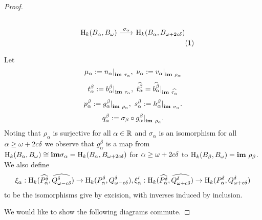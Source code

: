 \begin{proof}
\begin{scriptsize}
\begin{subequations}
\begin{minipage}{0.5\textwidth}
\begin{equation}
\begin{tikzcd}[column sep=scriptsize]
    \hom_k(B_\alpha, \B)\arrow{r}{\sigma_\alpha} &
    \hom_k(B_\alpha, \BB)
  \end{tikzcd}\end{equation}\end{minipage}
  \end{subequations}\vspace{3ex}
  \end{scriptsize}

  Let
  \[ \mu_\alpha := n_\alpha\mathord{\mid}_{\mathbf{im}~\tau_\alpha},\ \nu_\alpha := v_\alpha\mathord{\mid}_{\mathbf{im}~\rho_\alpha}\]
  \[ t_\alpha^\beta := b_\alpha^\beta\mathord{\mid}_{\mathbf{im}~\tau_\alpha},\ \widehat{t_\alpha^\beta} = \widehat{b_\alpha^\beta}\mathord{\mid}_{\mathbf{im}~\widehat{\tau_\alpha}}\]
  \[ p_\alpha^\beta := g_\alpha^\beta\mathord{\mid}_{\mathbf{im}~\rho_\alpha},\ s_\alpha^\beta := h_\alpha^\beta\mathord{\mid}_{\mathbf{im}~\sigma_\alpha}.\]
  \[q_\alpha^\beta := \sigma_\beta\circ g_\alpha^\beta\mathord{\mid}_{\mathbf{im}~\rho_\alpha}.\]%
  Noting that $\rho_\alpha$ is surjective for all $\alpha\in\mathbb{R}$ and $\sigma_\alpha$ is an isomorphism for all $\alpha\geq\omega+2c{\delta}$ we observe that $g_\alpha^\beta$ is a map from $\mathrm{H}_k(B_\alpha, B_{\omega})\cong \mathbf{im}\sigma_\alpha = \mathrm{H}_k(B_\alpha, B_{\omega + 2c{\delta}})$ for $\alpha\geq\omega+2c{\delta}$ to $\mathrm{H}_k(B_\beta, B_{\omega})= \mathbf{im}~\rho_\beta$.
  We also define
  \[ \xi_\alpha : \mathrm{H}_k(\widehat{P^{{\delta}}_\alpha}, \widehat{Q_{\omega - c{\delta}}^{\delta}})\to \mathrm{H}_k(P^{{\delta}}_\alpha, Q_{\omega - c{\delta}}^{\delta}), \xi_\alpha' : \mathrm{H}_k(\widehat{P^{{\delta}}_\alpha}, \widehat{Q_{\omega + c{\delta}}^{\delta}})\to \mathrm{H}_k(P^{{\delta}}_\alpha, Q_{\omega + c{\delta}}^{\delta})\]
  to be the isomorphisms give by excision, with inverses induced by inclusion.

  We would like to show the following diagrams commute.


\end{proof}
